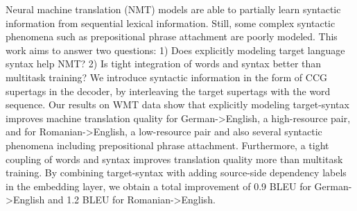 Neural machine translation (NMT) models are able to partially learn syntactic information from sequential lexical information. Still, some complex syntactic phenomena such as prepositional phrase attachment are poorly modeled. This work aims to answer two questions: 1) Does explicitly modeling target language syntax help NMT? 2) Is tight integration of words and syntax better than multitask training? We introduce syntactic information in the form of CCG supertags in the decoder, by interleaving the target supertags with the word sequence. Our results on WMT data show that explicitly modeling target-syntax improves machine translation quality for German->English, a high-resource pair, and for Romanian->English, a low-resource pair and also several syntactic phenomena including prepositional phrase attachment. Furthermore, a tight coupling of words and syntax improves translation quality more than multitask training. By combining target-syntax with adding source-side dependency labels in the embedding layer, we obtain a total improvement of  0.9 BLEU for German->English and 1.2 BLEU for Romanian->English.
